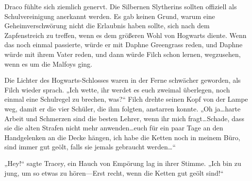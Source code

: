 Draco fühlte sich ziemlich genervt. Die Silbernen Slytherins sollten offiziell als Schulvereinigung anerkannt werden. Es gab keinen Grund, warum eine Geheimverschwörung nicht die Erlaubnis haben sollte, sich nach dem Zapfenstreich zu treffen, wenn es dem größeren Wohl von Hogwarts diente. Wenn das noch einmal passierte, würde er mit Daphne Greengrass reden, und Daphne würde mit ihrem Vater reden, und dann würde Filch schon lernen, wegzusehen, wenn es um die Malfoys ging.

Die Lichter des Hogwarts-Schlosses waren in der Ferne schwächer geworden, als Filch wieder sprach. „Ich wette, ihr werdet es euch zweimal überlegen, noch einmal eine Schulregel zu brechen, was?“ Filch drehte seinen Kopf von der Lampe weg, damit er die vier Schüler, die ihm folgten, anstarren konnte. „Oh ja…harte Arbeit und Schmerzen sind die besten Lehrer, wenn ihr mich fragt…Schade, dass sie die alten Strafen nicht mehr anwenden…euch für ein paar Tage an den Handgelenken an die Decke hängen, ich habe die Ketten noch in meinem Büro, sind immer gut geölt, falls sie jemals gebraucht werden…“

„Hey!“ sagte Tracey, ein Hauch von Empörung lag in ihrer Stimme. „Ich bin zu jung, um so etwas zu hören—Erst recht, wenn die Ketten gut geölt sind!“

